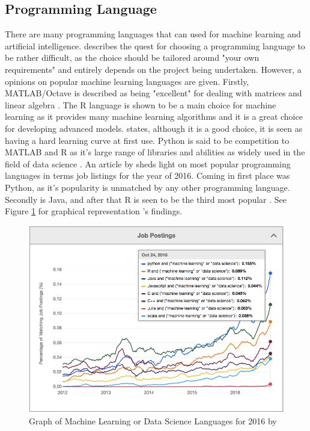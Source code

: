 \subsection{Programming Language}
There are many programming languages that can used for machine learning and artificial intelligence. \citeauthor{brownlee} describes the quest for choosing a programming language to be rather difficult, as the choice should be tailored around "your own requirements" and entirely depends on the project being undertaken. However, a opinions on popular machine learning languages are given. Firstly, MATLAB/Octave is described as being "excellent" for dealing with matrices and linear algebra \citep{brownlee}. The R language is shown to be a main choice for machine learning as it provides many machine learning algorithms and it is a great choice for developing advanced models. \citeauthor{brownlee} states, although it is a good choice, it is seen as having a hard learning curve at first use. Python is said to be competition to MATLAB and R as it's large range of libraries and abilities as widely used in the field of data science \citep{brownlee}.
An article by \citeauthor{verma_2017} sheds light on most popular programming languages in terms job listings for the year of 2016. Coming in first place was Python, as it's popularity is unmatched by any other programming language. Secondly is Java, and after that R is seen to be the third most popular \citep{verma_2017}. See Figure \ref{verma} for graphical representation \citeauthor{verma_2017}'s findings.

\begin{figure}[ht]
	\begin{center}
		\advance\leftskip-3cm
		\advance\rightskip-3cm
		\includegraphics[keepaspectratio=true,scale=0.6]{__resources/research/top_lang.jpg}
		\caption{Graph of Machine Learning or Data Science Languages for 2016 by \cite{verma_2017}}
		\label{verma}
	\end{center}
\end{figure}

